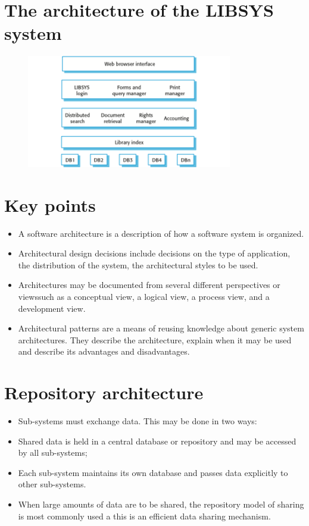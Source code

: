 \section{The architecture of the LIBSYS system}
\begin{figure}[h!]
    \centering
    \includegraphics[width = 0.8\textwidth]{./figures/L3_5.png}
    \caption{}
    \label{fig:L3_5}
\end{figure}

\section{Key points}
\begin{itemize}

\item A software architecture is a description of how a software system is organized.

\item Architectural design decisions include decisions on the type of application, the distribution of the system, the architectural styles to be used.

\item Architectures may be documented from several different perspectives or viewssuch as a conceptual view, a logical view, a process view, and a development view.

\item Architectural patterns are a means of reusing knowledge about generic system architectures. They describe the architecture, explain when it may be used and describe its advantages and disadvantages.


\end{itemize}
\section{Repository architecture}
\begin{itemize}
\item Sub-systems must exchange data. This may be done in two ways:

 \item Shared data is held in a central database or repository and may be accessed by all sub-systems;
 \item Each sub-system maintains its own database and passes data explicitly to other sub-systems.

\item When large amounts of data are to be shared, the repository model of sharing is most commonly used a this is an efficient data sharing mechanism.


\end{itemize}
